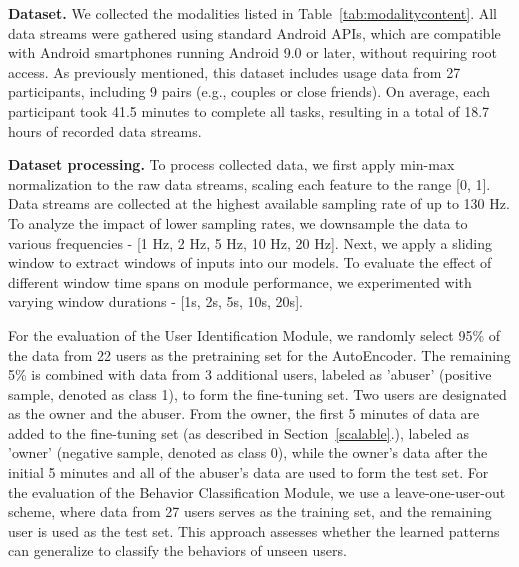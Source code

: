   
\noindent\textbf{Dataset.} We collected the modalities listed in Table~\ref{tab:modalitycontent}. All data streams were gathered using standard Android APIs, which are compatible with Android smartphones running Android 9.0 or later, without requiring root access. As previously mentioned, this dataset includes usage data from 27 participants, including 9 pairs (e.g., couples or close friends). On average, each participant took 41.5 minutes to complete all tasks, resulting in a total of 18.7 hours of recorded data streams. %


\noindent\textbf{Dataset processing.} To process collected data, we first apply min-max normalization to the raw data streams, scaling each feature to the range [0, 1]. Data streams are collected at the highest available sampling rate of up to 130 Hz. To analyze the impact of lower sampling rates, we downsample the data to various frequencies - [1 Hz, 2 Hz, 5 Hz, 10 Hz, 20 Hz]. Next, we apply a sliding window to extract windows of inputs into our models. To evaluate the effect of different window time spans on module performance, we experimented with varying window durations - [1s, 2s, 5s, 10s, 20s].

For the evaluation of the User Identification Module, we randomly select 95\% of the data from 22 users as the pretraining set for the AutoEncoder. The remaining 5\% is combined with data from 3 additional users, labeled as 'abuser' (positive sample, denoted as class 1), to form the fine-tuning set. Two users are designated as the owner and the abuser. From the owner, the first 5 minutes of data are added to the fine-tuning set (as described in Section~\ref{scalable}.), labeled as 'owner' (negative sample, denoted as class 0), while the owner's data after the initial 5 minutes and all of the abuser's data are used to form the test set. For the evaluation of the Behavior Classification Module, we use a leave-one-user-out scheme, where data from 27 users serves as the training set, and the remaining user is used as the test set. This approach assesses whether the learned patterns can generalize to classify the behaviors of unseen users. %



